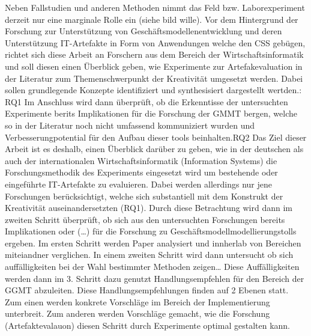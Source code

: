 Neben Fallstudien und anderen Methoden nimmt das Feld bzw. Laborexperiment derzeit nur eine marginale Rolle ein (siehe bild wille).
Vor dem Hintergrund der Forschung zur Unterstützung von Geschäftsmodellenentwicklung und deren Unterstützung IT-Artefakte in Form von Anwendungen welche den CSS gebügen, richtet sich diese Arbeit an Forschern aus dem Bereich der Wirtschaftsinformatik und soll diesen einen Überblick geben, wie Experimente zur Artefakevaluation in der Literatur zum Themenschwerpunkt der Kreativität umgesetzt werden. Dabei sollen grundlegende Konzepte identifiziert und synthesisiert dargestellt wertden.: RQ1 Im Anschluss wird dann überprüft, ob die Erkenntisse der untersuchten Experimente berits Implikationen für die Forschung der GMMT bergen, welche so in der Literatur noch nicht umfassend kommuniziert wurden und Verbesserungpotential für den Aufbau dieser tools beinhalten.RQ2
Das Ziel dieser Arbeit ist es deshalb, einen Überblick darüber zu geben, wie in der deutschen als auch der internationalen Wirtschaftsinformatik (Information Systems) die Forschungsmethodik des Experiments eingesetzt wird um bestehende oder eingeführte IT-Artefakte zu evaluieren. Dabei werden allerdings nur jene Forschungen berücksichtigt, welche sich substantiell mit dem Konstrukt der Kreativität auseinandersetzten (RQ1).  
Durch diese Betrachtung wird dann im zweiten Schritt überprüft, ob sich aus den untersuchten Forschungen bereits Implikationen oder (…) für die Forschung zu Geschäftsmodellmodellierungstolls ergeben.
Im ersten Schritt werden Paper analysiert und innherlab von Bereichen miteiandner verglichen. In einem zweiten Schritt wird dann untersucht ob sich auffälligkeiten bei der Wahl bestimmter Methoden zeigen… Diese Auffälligkeiten werden dann im 3. Schritt dazu genutzt Handlungsempfehlen für den Bereich der GGMT abzuleiten. Diese Handlungsempfehlungen finden auf 2 Ebenen statt. Zum einen werden konkrete Vorschläge im Bereich der Implementierung unterbreit. Zum anderen werden Vorschläge gemacht, wie die Forschung (Artefaktevalauon) diesen Schritt durch Experimente optimal gestalten kann.

